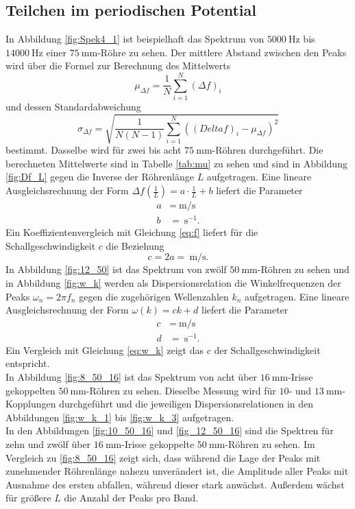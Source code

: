\subsection{Teilchen im periodischen Potential}
In Abbildung \ref{fig:Spek4_1} ist beispielhaft das Spektrum von  $\SI{5000}{\hertz}$ bis $\SI{14000}{\hertz}$ einer $\SI{75}{\milli\meter}$-Röhre zu sehen.
Der mittlere Abstand zwischen den Peaks wird über die Formel zur Berechnung des Mittelwerts
\[
\mu_{\Delta f} = \frac{1}{N}\sum_{i=1}^{N}(\Delta f)_i
\]
und dessen Standardabweichung
\[
\sigma_{\Delta f} = \sqrt{\frac{1}{N(N-1)}\sum_{i=1}^{N}((Delta f)_i-\mu_{\Delta f})^2}
\]
bestimmt. Dasselbe wird für zwei bis acht $\SI{75}{\milli\meter}$-Röhren durchgeführt. Die berechneten Mittelwerte sind in Tabelle
\ref{tab:mu} zu sehen und sind in Abbildung \ref{fig:Df_L} gegen die Inverse der Röhrenlänge $L$ aufgetragen. Eine lineare Ausgleichsrechnung der Form $\Delta f\left(\frac{1}{L}\right)= a\cdot\frac{1}{L}+b$ liefert die Parameter
\begin{align*}
a&=\SI{}{\meter\per\second}\\
b&=\SI{}{\second^{-1}}\text{.}
\end{align*}
Ein Koeffizientenvergleich mit Gleichung \eqref{eq:f} liefert für die Schallgeschwindigkeit $c$ die Beziehung
\[
c=2 a=\SI{}{\meter\per\second}\text{.}
\]
\newline
In Abbildung \ref{fig:12_50} ist das Spektrum von zwölf $\SI{50}{\milli\meter}$-Röhren zu sehen und in Abbildung \ref{fig:w_k} werden als Dispersionsrelation die Winkelfrequenzen der Peaks $\omega_n=2\pi f_n$ gegen die zugehörigen Wellenzahlen $k_n$ aufgetragen. Eine lineare Ausgleichsrechnung der Form $\omega(k)=c k + d$ liefert die Parameter
\begin{align*}
c&=\SI{}{\meter\per\second}\\
d&=\SI{}{\second^{-1}}\text{.}
\end{align*}
Ein Vergleich mit Gleichung \eqref{eq:w_k} zeigt das $c$ der Schallgeschwindigkeit entspricht.\\
In Abbildung \ref{fig:8_50_16} ist das Spektrum von acht über $\SI{16}{\milli\meter}$-Irisse gekoppelten $\SI{50}{\milli\meter}$-Röhren zu sehen. Dieselbe Messung wird für $10$- und $\SI{13}{\milli\meter}$-Kopplungen durchgeführt und die jeweiligen Dispersionsrelationen in den Abbildungen \ref{fig:w_k_1} bis \ref{fig:w_k_3} aufgetragen.\\
In den Abbildungen \ref{fig:10_50_16} und \ref{fig_12_50_16} sind die Spektren für zehn und zwölf über $\SI{16}{\milli\meter}$-Irisse gekoppelte $\SI{50}{\milli\meter}$-Röhren zu sehen. Im Vergleich zu \ref{fig:8_50_16} zeigt sich, dass während die Lage der Peaks  mit zunehmender Röhrenlänge nahezu unverändert ist, die Amplitude aller Peaks mit Ausnahme des ersten abfallen, während dieser stark anwächst. Außerdem wächst für größere $L$ die Anzahl der Peaks pro Band.\\
